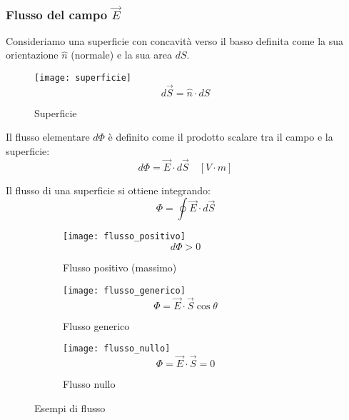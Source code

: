 \documentclass[a4paper]{article}
\begin{document}
\subsubsection{Flusso del campo \texorpdfstring{\( \vec{E} \)}{E}}
Consideriamo una superficie con concavità verso il basso definita come la sua orientazione
\( \hat{n} \) (normale) e la sua area \( dS \).
\begin{figure}[H]
  \centering
  \texttt{[image: superficie]}
  \[
    d\vec{S} = \hat{n} \cdot dS
  \] 
  \caption{Superficie}
\end{figure}
\begin{definition}
  Il flusso elementare \( d \Phi \) è definito come il prodotto scalare tra il campo
  e la superficie:
  \[
    d \Phi = \vec{E} \cdot d \vec{S} \quad \left[ V \cdot m \right]
  \] 

  \vspace{1em}
  \noindent
  Il flusso di una superficie si ottiene integrando:
  \[
    \Phi = \oint \vec{E} \cdot d \vec{S}
  \] 
  \begin{figure}[H]
    \centering
    \begin{subfigure}{0.3\textwidth}
      \texttt{[image: flusso\_positivo]}
      \[
        d \Phi > 0
      \] 
      \caption{Flusso positivo (massimo)}
    \end{subfigure}
    \hfil
    \begin{subfigure}{0.3\textwidth}
      \texttt{[image: flusso\_generico]}
      \[
       \Phi = \vec{E} \cdot \vec{S} \cos \theta
      \] 
      \caption{Flusso generico}
    \end{subfigure}
    \hfil
    \begin{subfigure}{0.3\textwidth}
      \texttt{[image: flusso\_nullo]}
      \[
        \Phi = \vec{E} \cdot \vec{S} = 0
      \] 
      \caption{Flusso nullo}
    \end{subfigure}
    \caption{Esempi di flusso}
  \end{figure}
\end{definition}
\end{document}
